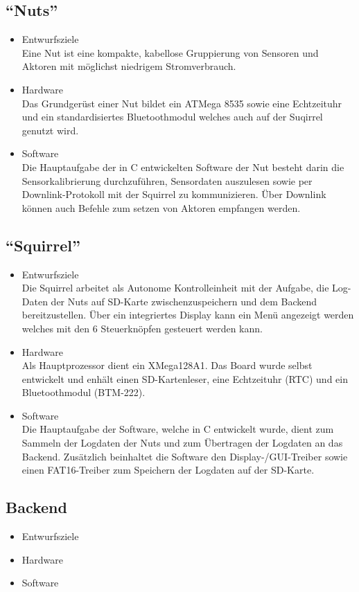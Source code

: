 \documentclass[12pt,a4paper]{article}
\begin{document}
\subsection{``Nuts''}
\begin{itemize}
	\item Entwurfsziele\\
	Eine Nut ist eine kompakte, kabellose Gruppierung von Sensoren und Aktoren mit möglichst niedrigem Stromverbrauch.
	\item Hardware\\
	Das Grundgerüst einer Nut bildet ein ATMega 8535 sowie eine Echtzeituhr und ein standardisiertes Bluetoothmodul welches auch auf der Suqirrel genutzt wird.
	\item Software\\
	Die Hauptaufgabe der in C entwickelten Software der Nut besteht darin die Sensorkalibrierung durchzuführen, Sensordaten auszulesen sowie per Downlink-Protokoll mit der Squirrel zu kommunizieren. Über Downlink können auch Befehle zum setzen von Aktoren empfangen werden.
\end{itemize}
\subsection{``Squirrel''}
\begin{itemize}
	\item Entwurfsziele\\
	Die Squirrel arbeitet als Autonome Kontrolleinheit mit der Aufgabe, die Log-Daten der Nuts auf SD-Karte zwischenzuspeichern und dem Backend bereitzustellen. Über ein integriertes Display kann ein Menü angezeigt werden welches mit den 6 Steuerknöpfen gesteuert werden kann.
	\item Hardware\\
	Als Hauptprozessor dient ein XMega128A1. Das Board wurde selbst entwickelt und enhält einen SD-Kartenleser, eine Echtzeituhr (RTC) und ein Bluetoothmodul (BTM-222).
	\item Software\\
	Die Hauptaufgabe der Software, welche in C entwickelt wurde, dient zum Sammeln der Logdaten der Nuts und zum Übertragen der Logdaten an das Backend. Zusätzlich beinhaltet die Software den Display-/GUI-Treiber sowie einen FAT16-Treiber zum Speichern der Logdaten auf der SD-Karte.
\end{itemize}
\subsection{Backend}
\begin{itemize}
	\item Entwurfsziele
	\item Hardware
	\item Software
\end{itemize}
\end{document}
